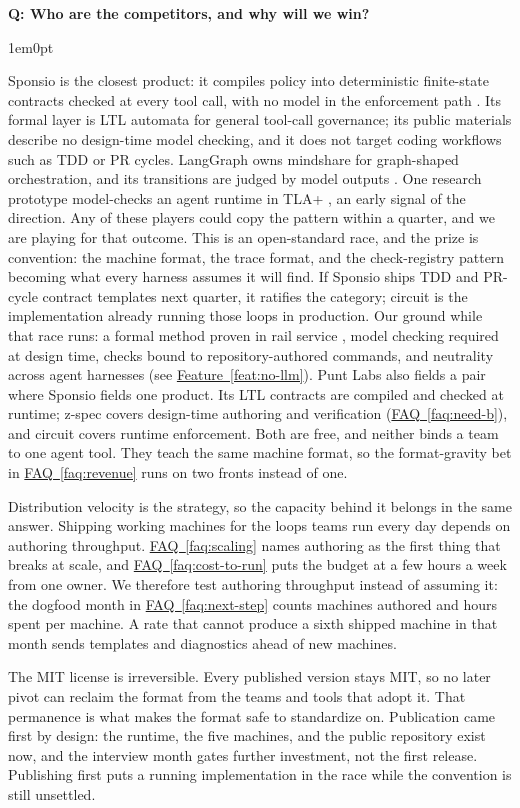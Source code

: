 \documentclass[11pt,letterpaper]{article}
\newcounter{faqnum}
\newenvironment{faqpair}[1]{%
  \needspace{4\baselineskip}%
  \vspace{0.5em}%
  \refstepcounter{faqnum}%
  \noindent\textbf{\color{SectionBlue}Q\thefaqnum: #1}\par\nopagebreak[4]%
  \vspace{0.2em}%
  \begin{adjustwidth}{1em}{0pt}%
  \setlength{\parindent}{0pt}%
}{%
  \end{adjustwidth}%
  \vspace{0.5em}%
}
\newcommand{\faqref}[1]{\hyperref[#1]{FAQ~\ref*{#1}}}
\newcommand{\featureref}[1]{\hyperref[#1]{Feature~\ref*{#1}}}
\begin{document}
\begin{faqpair}{Who are the competitors, and why will we win?}
\label{faq:competitive}
  Sponsio is the closest product: it compiles policy into deterministic finite-state contracts checked at every tool call, with no model in the enforcement path \cite{sponsio2026}. Its formal layer is LTL automata for general tool-call governance; its public materials describe no design-time model checking, and it does not target coding workflows such as TDD or PR cycles. LangGraph owns mindshare for graph-shaped orchestration, and its transitions are judged by model outputs \cite{langgraph2026docs}. One research prototype model-checks an agent runtime in TLA+ \cite{sharma2026ehv}, an early signal of the direction. Any of these players could copy the pattern within a quarter, and we are playing for that outcome. This is an open-standard race, and the prize is convention: the machine format, the trace format, and the check-registry pattern becoming what every harness assumes it will find. If Sponsio ships TDD and PR-cycle contract templates next quarter, it ratifies the category; circuit is the implementation already running those loops in production. Our ground while that race runs: a formal method proven in rail service \cite{lecomte2017bmethod25years}, model checking required at design time, checks bound to repository-authored commands, and neutrality across agent harnesses (see \featureref{feat:no-llm}). Punt Labs also fields a pair where Sponsio fields one product. Its LTL contracts are compiled and checked at runtime; z-spec covers design-time authoring and verification (\faqref{faq:need-b}), and circuit covers runtime enforcement. Both are free, and neither binds a team to one agent tool. They teach the same machine format, so the format-gravity bet in \faqref{faq:revenue} runs on two fronts instead of one.

  Distribution velocity is the strategy, so the capacity behind it belongs in the same answer. Shipping working machines for the loops teams run every day depends on authoring throughput. \faqref{faq:scaling} names authoring as the first thing that breaks at scale, and \faqref{faq:cost-to-run} puts the budget at a few hours a week from one owner. We therefore test authoring throughput instead of assuming it: the dogfood month in \faqref{faq:next-step} counts machines authored and hours spent per machine. A rate that cannot produce a sixth shipped machine in that month sends templates and diagnostics ahead of new machines.

  The MIT license is irreversible. Every published version stays MIT, so no later pivot can reclaim the format from the teams and tools that adopt it. That permanence is what makes the format safe to standardize on. Publication came first by design: the runtime, the five machines, and the public repository exist now, and the interview month gates further investment, not the first release. Publishing first puts a running implementation in the race while the convention is still unsettled.
\end{faqpair}
\end{document}
